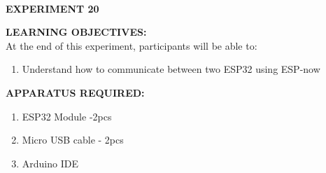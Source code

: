 \documentclass[12pt,a4paper]{article}
\begin{document}
\begin{center}

\textbf{\large \\EXPERIMENT 20 }\\[6pt]
\end{center}

\textbf{\large LEARNING OBJECTIVES:}\\[3pt]
At the end of this experiment, participants will be able to:\vspace{-6mm}
\begin{enumerate}
\setlength\itemsep{-0.3em}
\item Understand how to communicate between two ESP32 using ESP-now
\end{enumerate}

\textbf{\large APPARATUS REQUIRED:}\\
\vspace{-3mm}
\begin{enumerate}
 \setlength\itemsep{-0.3em}
\item ESP32 Module -2pcs
\item Micro USB cable - 2pcs
\item Arduino IDE
\end{enumerate}
\end{document}
